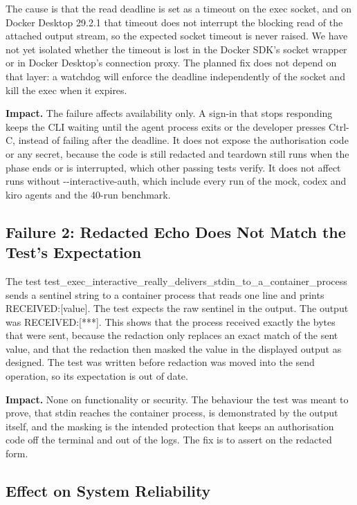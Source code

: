 \documentclass[12pt,a4paper,oneside]{report}
\begin{document}
The cause is that the read deadline is set as a timeout on the exec socket, and on Docker Desktop 29.2.1 that timeout does not interrupt the blocking read of the attached output stream, so the expected socket timeout is never raised. We have not yet isolated whether the timeout is lost in the Docker SDK's socket wrapper or in Docker Desktop's connection proxy. The planned fix does not depend on that layer: a watchdog will enforce the deadline independently of the socket and kill the exec when it expires.

\textbf{Impact.} The failure affects availability only. A sign-in that stops responding keeps the CLI waiting until the agent process exits or the developer presses Ctrl-C, instead of failing after the deadline. It does not expose the authorisation code or any secret, because the code is still redacted and teardown still runs when the phase ends or is interrupted, which other passing tests verify. It does not affect runs without -\allowbreak{}-interactive-auth, which include every run of the mock, codex and kiro agents and the 40-run benchmark.

\subsection{Failure 2: Redacted Echo Does Not Match the Test's Expectation}\label{failure-2}

The test test\_\allowbreak{}exec\_\allowbreak{}interactive\_\allowbreak{}really\_\allowbreak{}delivers\_\allowbreak{}stdin\_\allowbreak{}to\_\allowbreak{}a\_\allowbreak{}container\_\allowbreak{}process sends a sentinel string to a container process that reads one line and prints RECEIVED:[value]. The test expects the raw sentinel in the output. The output was RECEIVED:[***]. This shows that the process received exactly the bytes that were sent, because the redaction only replaces an exact match of the sent value, and that the redaction then masked the value in the displayed output as designed. The test was written before redaction was moved into the send operation, so its expectation is out of date.

\textbf{Impact.} None on functionality or security. The behaviour the test was meant to prove, that stdin reaches the container process, is demonstrated by the output itself, and the masking is the intended protection that keeps an authorisation code off the terminal and out of the logs. The fix is to assert on the redacted form.

\subsection{Effect on System Reliability}\label{failed-tests-reliability}
\end{document}
